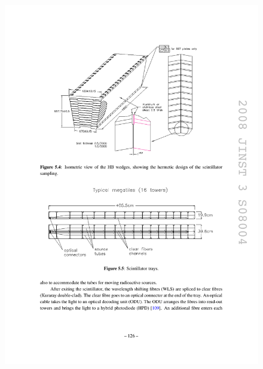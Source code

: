 \begin{figure}[hbtp]
  \begin{center}
    \includegraphics[width=\cmsFigWidth]{figures/cms-hcal-HBtray}

\end{center}
\end{figure}
